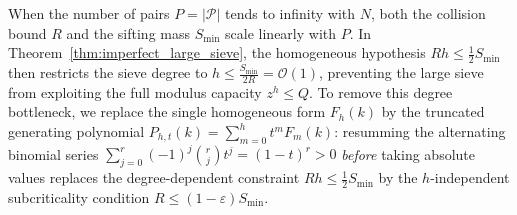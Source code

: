 \documentclass[11pt, a4paper]{article}
\theoremstyle{plain}
\theoremstyle{definition}
\begin{document}
When the number of pairs $P=|\mathcal{P}|$ tends to infinity with $N$, both the collision bound $R$ and the sifting mass $S_{\min}$ scale linearly with $P$. In Theorem~\ref{thm:imperfect_large_sieve}, the homogeneous hypothesis $Rh\le\frac12 S_{\min}$ then restricts the sieve degree to $h\le\frac{S_{\min}}{2R}=\mathcal{O}(1)$, preventing the large sieve from exploiting the full modulus capacity $z^h\le Q$. To remove this degree bottleneck, we replace the single homogeneous form $F_h(k)$ by the truncated generating polynomial $P_{h,t}(k)=\sum_{m=0}^{h}t^{m}F_m(k)$: resumming the alternating binomial series $\sum_{j=0}^{r}(-1)^{j}\binom{r}{j}t^{j}=(1-t)^{r}>0$ \emph{before} taking absolute values replaces the degree-dependent constraint $Rh\le\frac12 S_{\min}$ by the $h$-independent subcriticality condition $R\le(1-\varepsilon)S_{\min}$.
\end{document}
